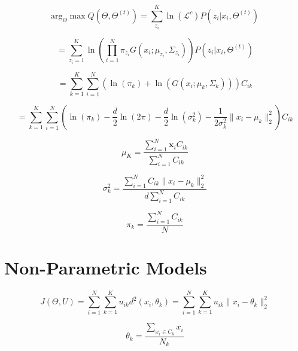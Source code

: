 \documentclass[10pt]{article}
\begin{document}
\begin{multicols}{2}
\begin{equation*}
    \text{arg}_{\Theta} \max Q(\Theta, \Theta^{(t)}) = \sum_{z_i}^{K} \ln(\mathcal{L}^c) P(z_i | x_i, \Theta^{(t)})
\end{equation*}

\begin{equation*}
    = \sum_{z_i = 1}^{K} \ln(\prod_{i=1}^{N} \pi_{z_{i}} G(x_i ; \mu_{z_{i}}, \Sigma_{z_{i}})) P(z_i | x_i, \Theta^{(t)})
\end{equation*}

\begin{equation*}
    = \sum_{k=1}^{K} \sum_{i=1}^{N} (\ln(\pi_{k}) + \ln(G(x_i ; \mu_{k}, \Sigma_{k}))) C_{ik}
\end{equation*}

\begin{equation*}
    = \sum_{k=1}^{K} \sum_{i=1}^{N} (\ln(\pi_{k}) - \frac{d}{2}\ln(2\pi) - \frac{d}{2}\ln(\sigma_{k}^2) - \frac{1}{2\sigma_{k}^2}\lVert x_i - \mu_{k} \rVert^2_2) C_{ik}
\end{equation*}

\begin{equation*}
    \mu_{K} = \frac{\sum_{i=1}^{N}\mathbf{x}_i C_{ik}}{\sum_{i=1}^{N} C_{ik}}
\end{equation*}

\begin{equation*}
    \sigma_{k}^2 = \frac{\sum_{i=1}^{N} C_{ik} \lVert x_i - \mu_{k} \rVert^2_2}{d \sum_{i=1}^{N} C_{ik}}
\end{equation*}

\begin{equation*}
    \pi_{k} = \frac{\sum_{i=1}^{N} C_{ik}}{N}
\end{equation*}

\section*{Non-Parametric Models}

\begin{equation*}
    J(\Theta, U) = \sum_{i=1}^{N} \sum_{k=1}^{K} u_{ik} d^2(x_i, \theta_k) = \sum_{i=1}^{N} \sum_{k=1}^{K} u_{ik} \lVert x_i - \theta_k \rVert^2_2
\end{equation*}

\begin{equation*}
    \theta_k = \frac{\sum_{x_i \in C_k}^{} x_i}{N_k}
\end{equation*}


\end{multicols}
\end{document}
